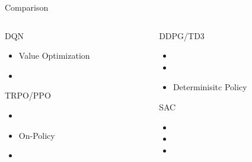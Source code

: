 \begin{frame}{Comparison}
    \begin{columns}[c]
    \begin{column}{0.5\textwidth}
    \begin{block}{DQN}
    \begin{itemize}
        \item \alert{Value Optimization}
        \item \color{blue}{Off-Policy}
        \vspace{0.25in}
    \end{itemize}
    \end{block}
    \begin{block}{TRPO/PPO}
        \begin{itemize}
            \item \color{blue}{Policy Optimization}
            \item \alert{On-Policy}
            \item  \color{blue}{Stochastic Policy}
        \end{itemize}
    \end{block}
    \end{column}
    \begin{column}{0.5\textwidth}
    \begin{block}{DDPG/TD3}
        \begin{itemize}
            \item \color{blue}{Policy Optimization}
            \item \color{blue}{Off-Policy}
            \item \alert{Determinisitc Policy}
        \end{itemize}    
    \end{block}
    \begin{block}{SAC}
        \begin{itemize}
            \item \color{blue}{Policy Optimization}
            \item \color{blue}{Off-Policy}
            \item \color{blue}{Stochastic Policy}
        \end{itemize}    
    \end{block}
    \end{column}
    \end{columns}

\end{frame}



